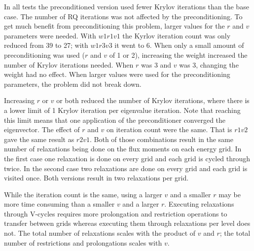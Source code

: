 In all tests the preconditioned version used fewer Krylov iterations than the base case. The number of RQ iterations was not affected by the preconditioning. To get much benefit from preconditioning this problem, larger values for the $r$ and $v$ parameters were needed. With $w1r1v1$ the Kyrlov iteration count was only reduced from 39 to 27; with $w1r3v3$ it went to 6. When only a small amount of preconditioning was used ($r$ and $v$ of 1 or 2), increasing the weight increased the number of Krylov iterations needed. When $r$ was 3 and $v$ was 3, changing the weight had no effect. When larger values were used for the preconditioning parameters, the problem did not break down. 

Increasing $r$ or $v$ or both reduced the number of Krylov iterations, where there is a lower limit of 1 Krylov iteration per eigenvalue iteration. Note that reaching this limit means that one application of the preconditioner converged the eigenvector. The effect of $r$ and $v$ on iteration count were the same. That is $r1v2$ gave the same result as $r2v1$. Both of those combinations result in the same number of relaxations being done on the flux moments on each energy grid. In the first case one relaxation is done on every grid and each grid is cycled through twice. In the second case two relaxations are done on every grid and each grid is visited once. Both versions result in two relaxations per grid. 

While the iteration count is the same, using a larger $v$ and a smaller $r$ may be more time consuming than a smaller $v$ and a larger $r$. Executing relaxations through V-cycles requires more prolongation and restriction operations to transfer between grids whereas executing them through relaxations per level does not. The total number of relaxations scales with the product of $v$ and $r$; the total number of restrictions and prolongations scales with $v$.

